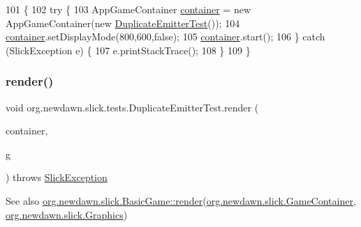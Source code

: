 \begin{DoxyCode}
101                                            \{
102         \textcolor{keywordflow}{try} \{
103             AppGameContainer \mbox{\hyperlink{classorg_1_1newdawn_1_1slick_1_1tests_1_1_duplicate_emitter_test_a1bd68c36e7b1214aa3633db618e0a7c5}{container}} = \textcolor{keyword}{new} AppGameContainer(\textcolor{keyword}{new} 
      \mbox{\hyperlink{classorg_1_1newdawn_1_1slick_1_1tests_1_1_duplicate_emitter_test_a5f0beb98ae988b43e0960237b26cbb7d}{DuplicateEmitterTest}}());
104             \mbox{\hyperlink{classorg_1_1newdawn_1_1slick_1_1tests_1_1_duplicate_emitter_test_a1bd68c36e7b1214aa3633db618e0a7c5}{container}}.setDisplayMode(800,600,\textcolor{keyword}{false});
105             \mbox{\hyperlink{classorg_1_1newdawn_1_1slick_1_1tests_1_1_duplicate_emitter_test_a1bd68c36e7b1214aa3633db618e0a7c5}{container}}.start();
106         \} \textcolor{keywordflow}{catch} (SlickException e) \{
107             e.printStackTrace();
108         \}
109     \}
\end{DoxyCode}
\mbox{\label{classorg_1_1newdawn_1_1slick_1_1tests_1_1_duplicate_emitter_test_aa665fe1ee32c30eba15459ec1718eabc}} 
\subsubsection{\texorpdfstring{render()}{render()}}
{\footnotesize\ttfamily void org.\+newdawn.\+slick.\+tests.\+Duplicate\+Emitter\+Test.\+render (\begin{DoxyParamCaption}\item[{\mbox{\hyperlink{classorg_1_1newdawn_1_1slick_1_1_game_container}{Game\+Container}}}]{container,  }\item[{\mbox{\hyperlink{classorg_1_1newdawn_1_1slick_1_1_graphics}{Graphics}}}]{g }\end{DoxyParamCaption}) throws \mbox{\hyperlink{classorg_1_1newdawn_1_1slick_1_1_slick_exception}{Slick\+Exception}}\hspace{0.3cm}{\ttfamily [inline]}}

\begin{DoxySeeAlso}{See also}
\mbox{\hyperlink{interfaceorg_1_1newdawn_1_1slick_1_1_game_af1a4670d43eb3ba04dfcf55ab1975b64}{org.\+newdawn.\+slick.\+Basic\+Game\+::render}}(\mbox{\hyperlink{classorg_1_1newdawn_1_1slick_1_1_game_container}{org.\+newdawn.\+slick.\+Game\+Container}}, \mbox{\hyperlink{classorg_1_1newdawn_1_1slick_1_1_graphics}{org.\+newdawn.\+slick.\+Graphics}}) 
\end{DoxySeeAlso}


